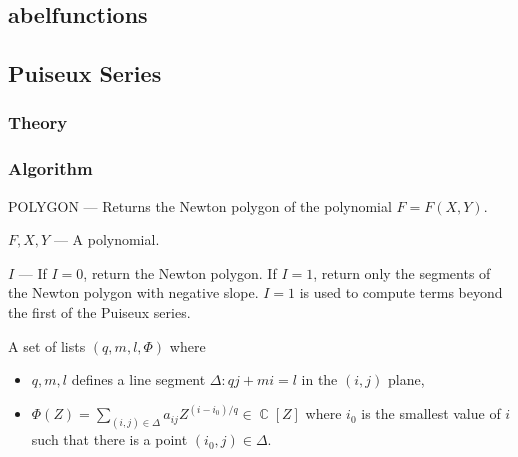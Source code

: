 \documentclass[10pt,twoside]{article}
\newcommand{\Input}{\Require}
\newcommand{\Output}{\Ensure}
\theoremstyle{plain}
\theoremstyle{definition}
\numberwithin{equation}{section}
\DeclareMathOperator{\CC}{\mathbb{C}}
\begin{document}
\subsection{abelfunctions}

\subsection{Puiseux Series}

\subsubsection*{Theory}

\subsubsection*{Algorithm}

\begin{algorithm}[h]
\caption{POLYGON --- Returns the Newton polygon of the polynomial $F =
  F(X,Y)$.}
\label{alg: puiseux-polygon}
\begin{algorithmic}[1]
\Input

$F,X,Y$ --- A polynomial.

$I$ --- If $I=0$, return the Newton polygon. If $I=1$, return only the
segments of the Newton polygon with negative slope. $I=1$ is used to
compute terms beyond the first of the Puiseux series.

\Output A set of lists $(q,m,l,\Phi)$ where
\begin{itemize}
  \item $q,m,l$ defines a line segment $\Delta: qj+mi=l$ in the $(i,j)$
    plane,
  \item $\Phi(Z) = \sum_{(i,j)\in\Delta} a_{ij} Z^{(i-i_0)/q} \in
    \CC[Z]$ where $i_0$ is the smallest value of $i$ such that there is
    a point $(i_0,j)\in\Delta$.
\end{itemize}

  \State
\EndFunction
\end{algorithmic}
\end{algorithm}
\end{document}
